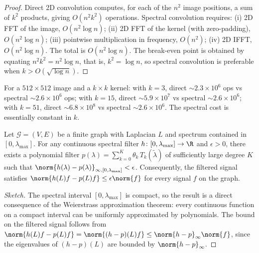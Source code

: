 \begin{proof}
Direct 2D convolution computes, for each of the $n^2$ image positions, a sum of
$k^2$ products, giving $O(n^2 k^2)$ operations. Spectral convolution requires:
(i) 2D FFT of the image, $O(n^2 \log n)$; (ii) 2D FFT of the kernel (with
zero-padding), $O(n^2 \log n)$; (iii) pointwise multiplication in frequency,
$O(n^2)$; (iv) 2D IFFT, $O(n^2 \log n)$. The total is $O(n^2 \log n)$. The
break-even point is obtained by equating $n^2 k^2 = n^2 \log n$, that is,
$k^2 = \log n$, so spectral convolution is preferable when
$k > O(\sqrt{\log n})$.
\end{proof}

\begin{example}
\label{ex:grids:efficiency}
For a $512 \times 512$ image and a $k \times k$ kernel: with $k = 3$, direct
$\sim 2.3 \times 10^6$ ops vs spectral $\sim 2.6 \times 10^6$ ops; with $k = 15$,
direct $\sim 5.9 \times 10^7$ vs spectral $\sim 2.6 \times 10^6$; with $k = 51$,
direct $\sim 6.8 \times 10^8$ vs spectral $\sim 2.6 \times 10^6$. The spectral
cost is essentially constant in $k$.
\end{example}

\begin{theorem}
\label{thm:grids:spectral-universal}
Let $\mathcal{G} = (V, E)$ be a finite graph with Laplacian $L$ and spectrum
contained in $[0, \lambda_{\max}]$. For any continuous spectral filter
$h \colon [0, \lambda_{\max}] \to \R$ and $\epsilon > 0$, there exists a
polynomial filter $p(\lambda) = \sum_{k=0}^{K} \theta_k\, T_k(\tilde{\lambda})$
of sufficiently large degree $K$ such that
$\norm{h(\lambda) - p(\lambda)}_{\infty, [0, \lambda_{\max}]} < \epsilon$.
Consequently, the filtered signal satisfies $\norm{h(L)f - p(L)f} \leq
\epsilon \norm{f}$ for every signal $f$ on the graph.
\end{theorem}

\begin{proof}[Sketch]
The spectral interval $[0, \lambda_{\max}]$ is compact, so the result is a
direct consequence of the Weierstrass approximation theorem: every continuous
function on a compact interval can be uniformly approximated by polynomials. The
bound on the filtered signal follows from $\norm{h(L)f - p(L)f} =
\norm{(h-p)(L)f} \leq \norm{h - p}_\infty \norm{f}$, since the eigenvalues of
$(h-p)(L)$ are bounded by $\norm{h-p}_\infty$.
\end{proof}

